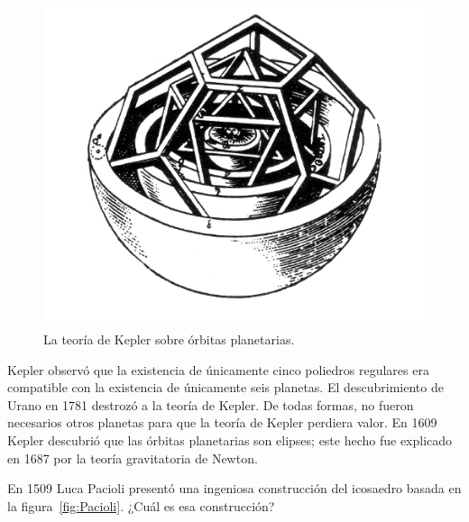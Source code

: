 \begin{figure}
   \centering
   \includegraphics[scale=0.3]{images/kepler}
   \caption{La teoría de Kepler sobre órbitas planetarias.}
   \label{fig:kepler}
\end{figure}

Kepler observó que la existencia de únicamente cinco poliedros regulares era
compatible con la existencia de únicamente seis planetas. El descubrimiento de
Urano en 1781 destrozó a la teoría de Kepler. De todas formas, no fueron
necesarios otros planetas para que la teoría de Kepler perdiera valor. En 1609
Kepler descubrió que las órbitas planetarias son elipses; este hecho fue
explicado en 1687 por la teoría gravitatoria de Newton. 



\begin{exercise}
	En 1509 Luca Pacioli presentó una ingeniosa construcción del icosaedro
	basada en la figura~\ref{fig:Pacioli}.  ¿Cuál es esa construcción?
\end{exercise}


